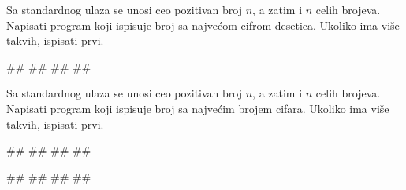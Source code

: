 \begin{Exercise}[label=p1.3_16] 
Sa standardnog ulaza se unosi ceo pozitivan broj $n$, a zatim i $n$
celih brojeva. Napisati program koji ispisuje broj sa najvećom cifrom
desetica. Ukoliko ima više takvih, ispisati prvi. 

\begin{miditest}
\begin{upotreba}{1}
#\naslovInt#
##
##
##
\end{upotreba}
\end{miditest}
\end{Exercise}
\begin{Answer}[ref=p1.3_16]
\end{Answer}

\begin{Exercise}[label=p1.3_17] 
Sa standardnog ulaza se unosi ceo pozitivan broj $n$, a zatim i $n$
celih brojeva. Napisati program koji ispisuje broj sa najvećim brojem
cifara. Ukoliko ima više takvih, ispisati prvi. 

\begin{miditest}
\begin{upotreba}{1}
#\naslovInt#
##
##
##
\end{upotreba}
\end{miditest}
\begin{miditest}
\begin{upotreba}{2}
#\naslovInt#
##
##
##
\end{upotreba}
\end{miditest}
\end{Exercise}
\begin{Answer}[ref=p1.3_17]
\end{Answer}

